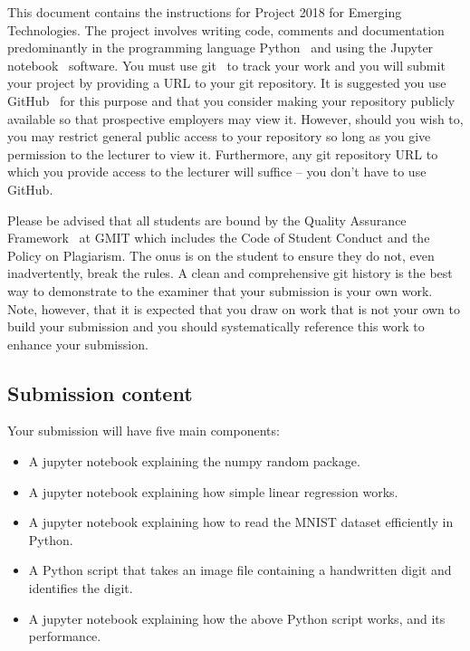 \documentclass[12pt, a4paper]{article}
\title{\projectname}
\author{\modulename}
\date{Due: \duedate}
\newcommand{\modulename}{Emerging Technologies}
\newcommand{\projectyear}{2018}
\newcommand{\projectname}{Project \projectyear}
\begin{document}
\maketitle

\noindent
This document contains the instructions for \projectname{} for \modulename{}.
The project involves writing code, comments and documentation predominantly in the programming language Python~\cite{python} and using the Jupyter notebook~\cite{jupyter} software.
You must use git~\cite{git} to track your work and you will submit your project by providing a URL to your git repository.
It is suggested you use GitHub~\cite{github} for this purpose and that you consider making your repository publicly available so that prospective employers may view it.
However, should you wish to, you may restrict general public access to your repository so long as you give permission to the lecturer to view it.
Furthermore, any git repository URL to which you provide access to the lecturer will suffice -- you don't have to use GitHub.

Please be advised that all students are bound by the Quality Assurance Framework~\cite{gmitqaf} at GMIT which includes the Code of Student Conduct and the Policy on Plagiarism.
The onus is on the student to ensure they do not, even inadvertently, break the rules.
A clean and comprehensive git history is the best way to demonstrate to the examiner that your submission is your own work.
Note, however, that it is expected that you draw on work that is not your own to build your submission and you should systematically reference this work to enhance your submission.

\subsection*{Submission content}
Your submission will have five main components:

\begin{itemize}
  \item A jupyter notebook explaining the numpy random package.
  \item A jupyter notebook explaining how simple linear regression works.
  \item A jupyter notebook explaining how to read the MNIST dataset efficiently in Python.
  \item A Python script that takes an image file containing a handwritten digit and identifies the digit.
  \item A jupyter notebook explaining how the above Python script works, and its performance.
\end{itemize}
\end{document}
